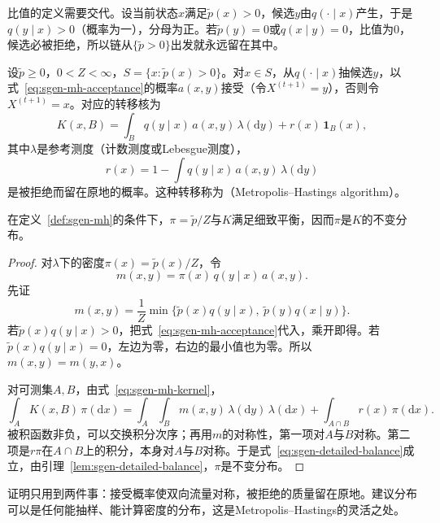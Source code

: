 比值的定义需要交代。设当前状态$x$满足$\widetilde{p}(x)>0$，候选$y$由$q(\cdot\mid x)$产生，于是$q(y\mid x)>0$（概率为一），分母为正。若$\widetilde{p}(y)=0$或$q(x\mid y)=0$，比值为$0$，候选必被拒绝，所以链从$\{\widetilde{p}>0\}$出发就永远留在其中。

\begin{definition}
\label{def:sgen-mh}
设$\widetilde{p}\ge0$，$0<Z<\infty$，$S=\{x:\widetilde{p}(x)>0\}$。对$x\in S$，从$q(\cdot\mid x)$抽候选$y$，以式~\eqref{eq:sgen-mh-acceptance}的概率$a(x,y)$接受（令$X^{(t+1)}=y$），否则令$X^{(t+1)}=x$。对应的转移核为
\begin{equation}
  K(x,B)=\int_{B}q(y\mid x)\,a(x,y)\,\lambda(\mathrm{d}y)+r(x)\,\mathbf{1}_{B}(x),
  \label{eq:sgen-mh-kernel}
\end{equation}
其中$\lambda$是参考测度（计数测度或Lebesgue测度），
\begin{equation}
  r(x)=1-\int q(y\mid x)\,a(x,y)\,\lambda(\mathrm{d}y)
  \label{eq:sgen-mh-reject}
\end{equation}
是被拒绝而留在原地的概率。这种转移称为（Metropolis--Hastings algorithm）。
\end{definition}

\begin{theorem}
\label{thm:sgen-mh}
在定义~\ref{def:sgen-mh}的条件下，$\pi=\widetilde{p}/Z$与$K$满足细致平衡，因而$\pi$是$K$的不变分布。
\end{theorem}

\begin{proof}
对$\lambda$下的密度$\pi(x)=\widetilde{p}(x)/Z$，令
\[
  m(x,y)=\pi(x)\,q(y\mid x)\,a(x,y).
\]
先证
\[
  m(x,y)=\frac1Z\min\bigl\{\widetilde{p}(x)q(y\mid x),\ \widetilde{p}(y)q(x\mid y)\bigr\}.
\]
若$\widetilde{p}(x)q(y\mid x)>0$，把式~\eqref{eq:sgen-mh-acceptance}代入，乘开即得。若$\widetilde{p}(x)q(y\mid x)=0$，左边为零，右边的最小值也为零。所以$m(x,y)=m(y,x)$。

对可测集$A,B$，由式~\eqref{eq:sgen-mh-kernel}，
\[
  \int_{A}K(x,B)\,\pi(\mathrm{d}x)=\int_{A}\int_{B}m(x,y)\,\lambda(\mathrm{d}y)\,\lambda(\mathrm{d}x)+\int_{A\cap B}r(x)\,\pi(\mathrm{d}x).
\]
被积函数非负，可以交换积分次序；再用$m$的对称性，第一项对$A$与$B$对称。第二项是$r\pi$在$A\cap B$上的积分，本身对$A$与$B$对称。于是式~\eqref{eq:sgen-detailed-balance}成立，由引理~\ref{lem:sgen-detailed-balance}，$\pi$是不变分布。
\end{proof}

证明只用到两件事：接受概率使双向流量对称，被拒绝的质量留在原地。建议分布可以是任何能抽样、能计算密度的分布，这是Metropolis--Hastings的灵活之处。

